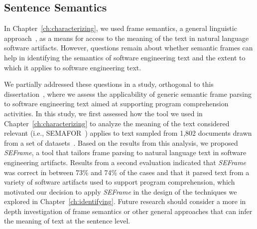 








\subsection{Sentence Semantics}
\label{cp7:semantics}




In Chapter~\ref{ch:characterizing}, we used frame semantics, a general linguistic approach~\cite{fillmore1976frame},
as a means for access to the meaning of the text in natural language software artifacts.
However, questions remain about whether
semantic frames can help in identifying the semantics of software engineering text
and the extent to which it applies to software engineering text.




We partially addressed these questions in a study, 
orthogonal to this dissertation~\cite{marques2021},
where we assess the applicability of generic semantic frame
parsing to software engineering text
aimed at supporting program
comprehension activities.
In this study, we first assessed how the tool we used in Chapter~\ref{ch:characterizing}
to analyze the meaning of the text considered relevant (i.e., SEMAFOR~\cite{das2014frame})
 applies to text sampled from 1,802 documents drawn from a set of datasets~\cite{Arya2019, Xu2017, Maalej2013, Chaparro2017}. 
Based on the results from this analysis, 
we proposed \textit{SEFrame}, a tool that tailors 
frame parsing to natural language text in software engineering artifacts.
Results from a second evaluation indicated that \textit{SEFrame} was 
 correct in between 73\% and 74\% of
the cases and that it parsed text from a variety of software artifacts used to support program
comprehension, which motivated our decision to apply \textit{SEFrame} 
in the design of the techniques we explored in Chapter~\ref{ch:identifying}.
Future research should consider
a more in depth investigation of 
frame semantics or other general approaches that can infer the meaning of text at the sentence level. 


